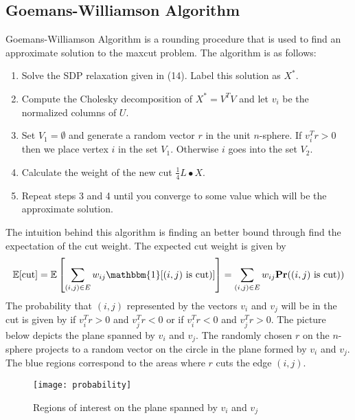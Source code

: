 \documentclass{article}
\begin{document}
\subsection{Goemans-Williamson Algorithm}
Goemans-Williamson Algorithm is a rounding procedure that is used to find an approximate solution to the maxcut problem. The algorithm is as follows:
\begin{enumerate}
\item Solve the SDP relaxation given in (14). Label this solution as $X^*$.
\item Compute the Cholesky decomposition of $X^* = V^TV$ and let $v_i$ be the normalized columns of $U$.
\item Set $V_1=\emptyset$ and generate a random vector $r$ in the unit $n$-sphere. If $v_i^Tr > 0$ then we place vertex $i$ in the set $V_1$. Otherwise $i$ goes into the set $V_2$.
\item Calculate the weight of the new cut $\frac{1}{4}L\bullet X$.
\item Repeat steps 3 and 4 until you converge to some value which will be the approximate solution.
\end{enumerate}
The intuition behind this algorithm is finding an better bound through find the expectation of the cut weight. The expected cut weight is given by
\[\mathbb{E}[\text{cut}] = \mathbb{E}\left[\sum_{(i,j) \in E}w_{ij} \mathbbm{1}[(i,j)\text{ is cut})]\right] = \sum_{(i,j) \in E}w_{ij} \textbf{Pr}((i,j)\text{ is cut}))\]
The probability that $(i,j)$ represented by the vectors $v_i$ and $v_j$ will be in the cut is given by if $v_i^Tr > 0$ and $v_j^Tr < 0$ or if $v_i^Tr < 0$ and $v_j^Tr > 0$. The picture below depicts the plane spanned by $v_i$ and $v_j$. The randomly chosen $r$ on the $n$-sphere projects to a random vector on the circle in the plane formed by $v_i$ and $v_j$. The blue regions correspond to the areas where $r$ cuts the edge $(i,j)$.
\begin{figure}[h]
\caption{Regions of interest on the plane spanned by $v_i$ and $v_j$}
\texttt{[image: probability]}
\centering
\end{figure}
\end{document}
